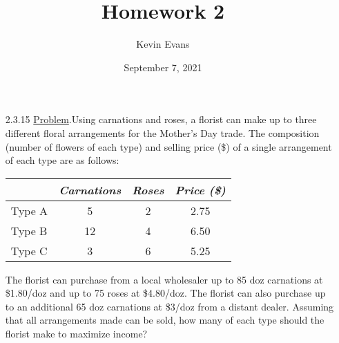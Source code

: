 \documentclass{homework}
\title{Homework 2}
\author{Kevin Evans}
\date{September 7, 2021}
\begin{document}
	\maketitle
	\begin{enumerate}
		\item[2.3.15] \underline{Problem}.\quad Using carnations and roses, a florist can make up to three different floral arrangements for the Mother's Day trade. The composition (number of flowers of each type) and selling price (\$)  of a single arrangement of each type are as follows:
		
		\begin{table}[h]
			\centering
			\begin{tabular}{lccc}
				\toprule
				& \textit{Carnations} & \textit{Roses} & \textit{Price (\$)} \\
				\midrule
				Type A & 5 & 2 & 2.75 \\
				Type B & 12 & 4 & 6.50 \\
				Type C & 3 & 6 & 5.25 \\
				\bottomrule
			\end{tabular}
		\end{table}
		
		The florist can purchase from a local wholesaler up to 85 doz carnations at \$1.80/doz and up to 75 roses at \$4.80/doz. The florist can also purchase up to an additional 65 doz carnations at \$3/doz from a distant dealer. Assuming that all arrangements made can be sold, how many of each type should the florist make to maximize income?
		

\end{enumerate}
\end{document}

